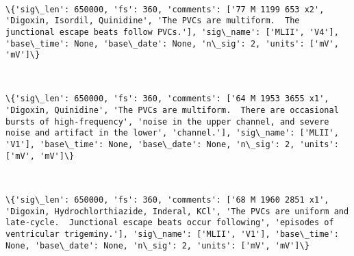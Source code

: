 \documentclass[11pt]{article}
\begin{document}
    \begin{center}
    \end{center}
    { \hspace*{\fill} \\}
    
    \begin{Verbatim}[commandchars=\\\{\}]
\{'sig\_len': 650000, 'fs': 360, 'comments': ['77 M 1199 653 x2', 'Digoxin, Isordil, Quinidine', 'The PVCs are multiform.  The junctional escape beats follow PVCs.'], 'sig\_name': ['MLII', 'V4'], 'base\_time': None, 'base\_date': None, 'n\_sig': 2, 'units': ['mV', 'mV']\}

    \end{Verbatim}

    \begin{center}
    \end{center}
    { \hspace*{\fill} \\}
    
    \begin{Verbatim}[commandchars=\\\{\}]
\{'sig\_len': 650000, 'fs': 360, 'comments': ['64 M 1953 3655 x1', 'Digoxin, Quinidine', 'The PVCs are multiform.  There are occasional bursts of high-frequency', 'noise in the upper channel, and severe noise and artifact in the lower', 'channel.'], 'sig\_name': ['MLII', 'V1'], 'base\_time': None, 'base\_date': None, 'n\_sig': 2, 'units': ['mV', 'mV']\}

    \end{Verbatim}

    \begin{center}
    \end{center}
    { \hspace*{\fill} \\}
    
    \begin{Verbatim}[commandchars=\\\{\}]
\{'sig\_len': 650000, 'fs': 360, 'comments': ['68 M 1960 2851 x1', 'Digoxin, Hydrochlorthiazide, Inderal, KCl', 'The PVCs are uniform and late-cycle.  Junctional escape beats occur following', 'episodes of ventricular trigeminy.'], 'sig\_name': ['MLII', 'V1'], 'base\_time': None, 'base\_date': None, 'n\_sig': 2, 'units': ['mV', 'mV']\}

    \end{Verbatim}
\end{document}
